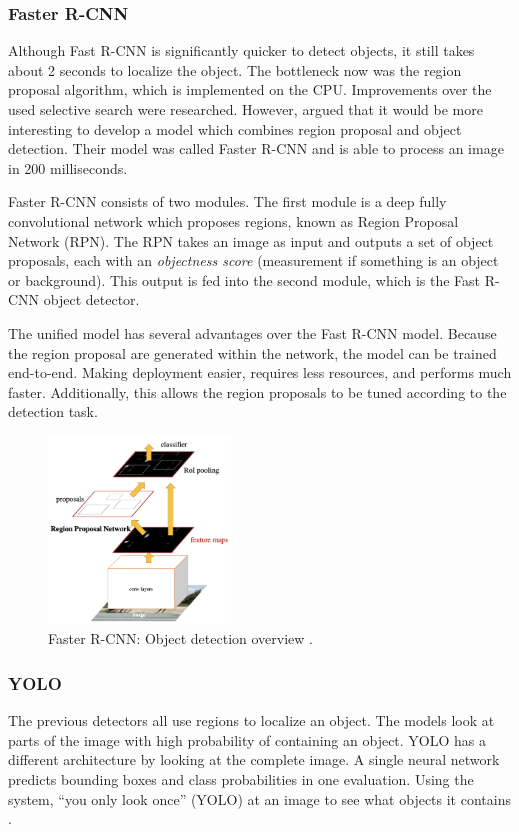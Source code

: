 \subsubsection{Faster R-CNN}
Although Fast R-CNN is significantly quicker to detect objects, it still takes about 2 seconds to localize the object. The bottleneck now was the region proposal algorithm, which is implemented on the CPU. Improvements over the used selective search were researched. However,  argued that it would be more interesting to develop a model which combines region proposal and object detection. Their model was called Faster R-CNN and is able to process an image in 200 milliseconds. 

Faster R-CNN consists of two modules. The first module is a deep fully convolutional network which proposes regions, known as Region Proposal Network (RPN). The RPN takes an image as input and outputs a set of object proposals, each with an \textit{objectness score} (measurement if something is an object or background). This output is fed into the second module, which is the Fast R-CNN object detector. 

The unified model has several advantages over the Fast R-CNN model. Because the region proposal are generated within the network, the model can be trained end-to-end. Making deployment easier, requires less resources, and performs much faster. Additionally, this allows the region proposals to be tuned according to the detection task.


\begin{figure}[ht]
\begin{center}
\includegraphics[height=5cm,keepaspectratio]{images/2_literature/faster-r-cnn.png}
\end{center}
\caption{Faster R-CNN: Object detection overview \cite{Ren2015}.}
\end{figure}


\subsubsection{YOLO}
The previous detectors all use regions to localize an object. The models look at parts of the image with high probability of containing an object. YOLO has a different architecture by looking at the complete image. A single neural network predicts bounding boxes and class probabilities in one evaluation. Using the system, ``you only look once'' (YOLO) at an image to see what objects it contains .

